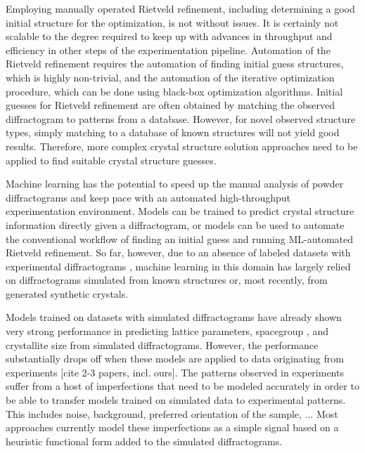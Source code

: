Employing manually operated Rietveld refinement, including determining a good initial structure for the optimization, is not without issues.
It is certainly not scalable to the degree required to keep up with advances in throughput and efficiency in other steps of the experimentation pipeline.
Automation of the Rietveld refinement requires the automation of finding initial guess structures, which is highly non-trivial, and the automation of the iterative optimization procedure, which can be done using black-box optimization algorithms. \cite{Ozaki2020} 
Initial guesses for Rietveld refinement are often obtained by matching the observed diffractogram to patterns from a database. \cite{Belsky2002, GatesRector2019}
However, for novel observed structure types, simply matching to a database of known structures will not yield good results. Therefore, more complex crystal structure solution approaches need to be applied to find suitable crystal structure guesses.

Machine learning has the potential to speed up the manual analysis of powder diffractograms and keep pace with an automated high-throughput experimentation environment. \cite{Agrawal2019, Surdu2023}
Models can be trained to predict crystal structure information directly given a diffractogram, or models can be used to automate the conventional workflow of finding an initial guess and running ML-automated Rietveld refinement. \cite{Surdu2023,Feng2019} 
So far, however, due to an absence of labeled datasets with experimental diffractograms\cite{Wang2020} , machine learning in this domain has largely relied on diffractograms simulated from known structures\cite{Park2017, Lee2023} or, most recently, from generated synthetic crystals. \cite{Schopmans2023}

Models trained on datasets with simulated diffractograms have already shown very strong performance in predicting
lattice parameters, spacegroup \cite{Schopmans2023, Oviedo2018, Park2017, Vecsei2018, Zaloga2020, Suzuki2020, Chakraborty2021}, and crystallite size from simulated diffractograms.
However, the performance substantially drops off when these models are applied to data originating from experiments [cite 2-3 papers, incl. ours].
The patterns observed in experiments suffer from a host of imperfections that need to be modeled accurately in order to be able to transfer models trained on simulated data to experimental patterns. This includes noise, background, preferred orientation of the sample, ...
Most approaches currently model these imperfections as a simple signal based on a heuristic functional form added to the simulated diffractograms.

